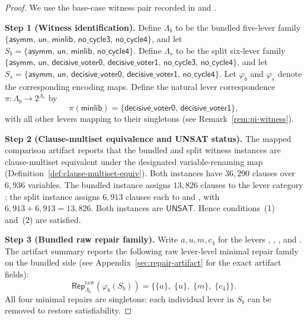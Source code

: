 \begin{proof}
We use the base-case witness pair recorded in
and .

\medskip
\noindent\textbf{Step 1 (Witness identification).}
Define $\Lambda_b$ to be the bundled five-lever family
$\{\mathsf{asymm},\, \mathsf{un},\, \mathsf{minlib},\, \mathsf{no\_cycle3},\, \mathsf{no\_cycle4}\}$,
and let $S_b = \{\mathsf{asymm},\, \mathsf{un},\, \mathsf{minlib},\, \mathsf{no\_cycle4}\}$.
Define $\Lambda_s$ to be the split six-lever family
$\{\mathsf{asymm},\, \mathsf{un},\, \mathsf{decisive\_voter0},\, \mathsf{decisive\_voter1},\, \mathsf{no\_cycle3},\, \mathsf{no\_cycle4}\}$,
and let $S_s = \{\mathsf{asymm},\, \mathsf{un},\, \mathsf{decisive\_voter0},\, \mathsf{decisive\_voter1},\, \mathsf{no\_cycle4}\}$.
Let $\varphi_b$ and $\varphi_s$ denote the corresponding encoding maps.
Define the natural lever correspondence $\pi : \Lambda_b \to 2^{\Lambda_s}$ by
\[
  \pi(\mathsf{minlib}) = \{\mathsf{decisive\_voter0},\, \mathsf{decisive\_voter1}\},
\]
with all other levers mapping to their singletons (see Remark~\ref{rem:pi-witness}).

\medskip
\noindent\textbf{Step 2 (Clause-multiset equivalence and UNSAT status).}
The mapped comparison artifact reports that the bundled and split witness instances are clause-multiset equivalent under the designated variable-renaming map (Definition~\ref{def:clause-multiset-equiv}).
Both instances have $36{,}290$ clauses over $6{,}936$ variables.
The bundled instance assigns $13{,}826$ clauses to the lever category ;
the split instance assigns $6{,}913$ clauses each to  and ,
with $6{,}913 + 6{,}913 = 13{,}826$.
Both instances are $\mathsf{UNSAT}$.
Hence conditions~(1) and~(2) are satisfied.

\medskip
\noindent\textbf{Step 3 (Bundled raw repair family).}
Write $a,u,m,c_4$ for the levers , , , and .
The artifact summary reports the following raw lever-level minimal repair family on the bundled side (see Appendix~\ref{sec:repair-artifact} for the exact artifact fields):
\[
  \mathsf{Rep}^{\mathrm{raw}}_{\Lambda_b}(\varphi_b(S_b))
  = \bigl\{\{a\},\;\{u\},\;\{m\},\;\{c_4\}\bigr\}.
\]
All four minimal repairs are singletons: each individual lever in $S_b$ can be removed to restore satisfiability.


\end{proof}
